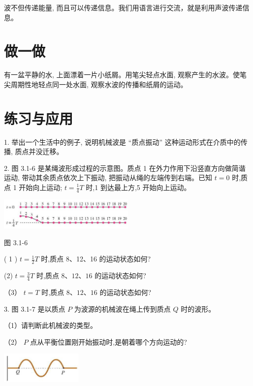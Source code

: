 \documentclass[10pt]{article}
\begin{document}
波不但传递能量, 而且可以传递信息。我们用语言进行交流，就是利用声波传递信息。

\section*{做一做}

有一盆平静的水, 上面漂着一片小纸屑。用笔尖轻点水面, 观察产生的水波。使笔尖周期性地轻点同一处水面, 观察水波的传播和纸屑的运动。

\section*{练习与应用}

1. 举出一个生活中的例子, 说明机械波是 “质点振动” 这种运动形式在介质中的传播, 质点并没迁移。

2. 图 3.1-6 是某绳波形成过程的示意图。质点 1 在外力作用下沿竖直方向做简谐运动, 带动其余质点依次上下振动, 把振动从绳的左端传到右端。已知 \(t = 0\) 时,质点 1 开始向上运动; \(t = \frac{1}{4}T\) 时,1 到达最上方,5 开始向上运动。

\begin{center}
\includegraphics[max width=0.5\textwidth]{images/01910e4c-ebb8-7d2c-8f2f-2375bc1d2d12_71_585451.jpg}
\end{center}

图 3.1-6

( 1 ) \(t = \frac{1}{2}T\) 时,质点 8、12、16 的运动状态如何?

(2) \(t = \frac{3}{4}T\) 时,质点 \(8\text{、}{12}\text{、}{16}\) 的运动状态如何?

（3） \(t = T\) 时,质点 \(8\text{、}{12}\text{、}{16}\) 的运动状态如何?

3. 图 3.1-7 是以质点 \(P\) 为波源的机械波在绳上传到质点 \(Q\) 时的波形。

（1）请判断此机械波的类型。

（2） \(P\) 点从平衡位置刚开始振动时,是朝着哪个方向运动的?

\begin{center}
\includegraphics[max width=0.3\textwidth]{images/01910e4c-ebb8-7d2c-8f2f-2375bc1d2d12_71_932762.jpg}
\end{center}
\end{document}

